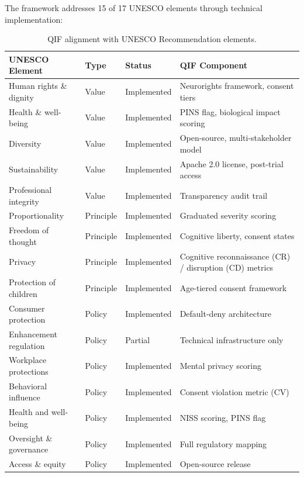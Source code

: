 The \qif framework addresses 15 of 17 UNESCO elements through technical
implementation:

\begin{table}[H]
\centering
\caption{QIF alignment with UNESCO Recommendation elements.}
\label{tab:unesco}
\small
\begin{tabularx}{\textwidth}{@{}l l l X@{}}
\toprule
\textbf{UNESCO Element} & \textbf{Type} & \textbf{Status} & \textbf{QIF Component} \\
\midrule
Human rights \& dignity        & Value     & Implemented & Neurorights framework, consent tiers \\
Health \& well-being           & Value     & Implemented & PINS flag, biological impact scoring \\
Diversity                      & Value     & Implemented & Open-source, multi-stakeholder model \\
Sustainability                 & Value     & Implemented & Apache 2.0 license, post-trial access \\
Professional integrity         & Value     & Implemented & Transparency audit trail \\
Proportionality                & Principle & Implemented & Graduated severity scoring \\
Freedom of thought             & Principle & Implemented & Cognitive liberty, consent states \\
Privacy                        & Principle & Implemented & Cognitive reconnaissance (CR) / disruption (CD) metrics \\
Protection of children         & Principle & Implemented & Age-tiered consent framework \\
Consumer protection            & Policy    & Implemented & Default-deny architecture \\
Enhancement regulation         & Policy    & Partial     & Technical infrastructure only \\
Workplace protections          & Policy    & Implemented & Mental privacy scoring \\
Behavioral influence           & Policy    & Implemented & Consent violation metric (CV) \\
Health and well-being          & Policy    & Implemented & NISS scoring, PINS flag \\
Oversight \& governance        & Policy    & Implemented & Full regulatory mapping \\
Access \& equity               & Policy    & Implemented & Open-source release \\
\bottomrule
\end{tabularx}
\end{table}

